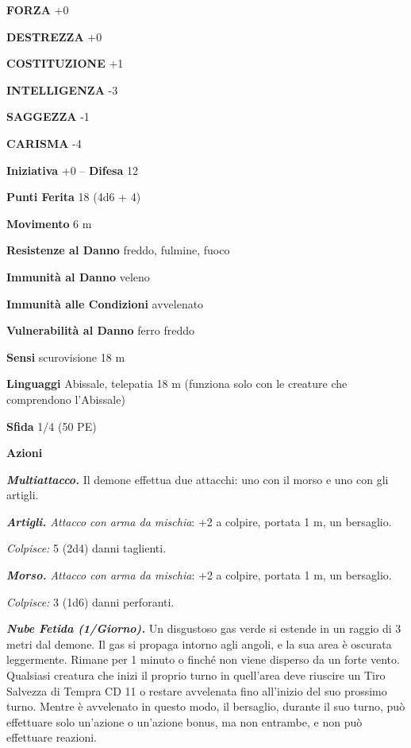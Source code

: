 \begin{multicols}{2}
\textbf{FORZA} +0

\textbf{DESTREZZA} +0

\textbf{COSTITUZIONE} +1

\textbf{INTELLIGENZA} -3

\textbf{SAGGEZZA} -1

\textbf{CARISMA} -4

\textbf{Iniziativa} +0 -- \textbf{Difesa} 12

\textbf{Punti Ferita} 18 (4d6 + 4)

\textbf{Movimento} 6 m

\textbf{Resistenze al Danno} freddo, fulmine, fuoco

\textbf{Immunità al Danno} veleno

\textbf{Immunità alle Condizioni} avvelenato

\textbf{Vulnerabilità al Danno} ferro freddo

\textbf{Sensi} scurovisione 18 m

\textbf{Linguaggi} Abissale, telepatia 18 m (funziona solo con le creature che comprendono l'Abissale)

\textbf{Sfida} 1/4 (50 PE)

\textbf{Azioni}

\emph{\textbf{Multiattacco.}} Il demone effettua due attacchi: uno con il morso e uno con gli artigli.

\emph{\textbf{Artigli.} Attacco con arma da mischia}: +2 a colpire, portata 1 m, un bersaglio.

\emph{Colpisce:} 5 (2d4) danni taglienti.

\emph{\textbf{Morso.} Attacco con arma da mischia}: +2 a colpire, portata 1 m, un bersaglio.

\emph{Colpisce:} 3 (1d6) danni perforanti.

\emph{\textbf{Nube Fetida (1/Giorno).}} Un disgustoso gas verde si estende in un raggio di 3 metri dal demone. Il gas si propaga intorno agli angoli, e la sua area è oscurata leggermente. Rimane per 1 minuto o finché non viene disperso da un forte vento. Qualsiasi creatura che inizi il proprio turno in quell'area deve riuscire un Tiro Salvezza di Tempra CD 11 o restare avvelenata fino all'inizio del suo prossimo turno. Mentre è avvelenato in questo modo, il bersaglio, durante il suo turno, può effettuare solo un'azione o un'azione bonus, ma non entrambe, e non può effettuare reazioni.


\end{multicols}
